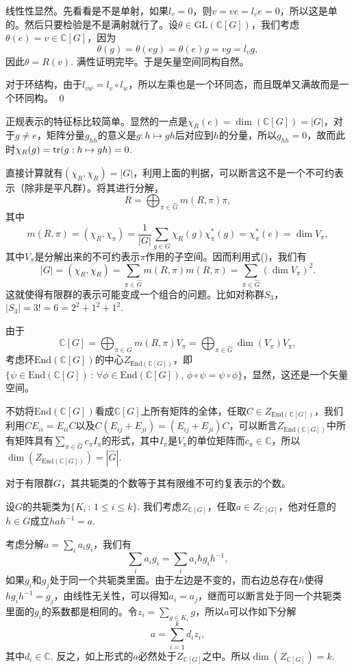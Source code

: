 \documentclass[10pt]{article}
\newcommand{\cc}{\mathbb{C}}
\begin{document}
\proof
	线性性显然。先看看是不是单射，如果$l_v=0$，则$v=ve=l_ve=0$，所以这是单的。然后只要检验是不是满射就行了。设$\theta\in \mathrm{GL}(\cc [G])$，我们考虑$\theta(e)=v\in \cc [G]$，因为
	\[
		\theta(g)=\theta(eg)=\theta(e)g=vg=l_vg,
	\]
	因此$\theta=R(v)$. 满性证明完毕。于是矢量空间同构自然。

	对于环结构，由于$l_{vw}=l_v\circ l_w$，所以左乘也是一个环同态，而且既单又满故而是一个环同构。
\qed

\para 正规表示的特征标比较简单。显然的一点是$\chi_R(e)=\dim (\cc [G])=|G|$，对于$g\neq e$，矩阵分量$g_{hh}$的意义是$g:h\mapsto gh$后对应到$h$的分量，所以$g_{hh}=0$，故而此时$\chi_R(g)=\operatorname{tr}(g:h\mapsto gh)=0$.

直接计算就有$(\chi_{R},\chi_{R})=|G|$，利用上面的判据，可以断言这不是一个不可约表示（除非是平凡群）。将其进行分解，
\[
	R=\bigoplus_{\pi\in\hat{G}}m(R,\pi)\pi,
\]
其中
\[
	m(R,\pi)=(\chi_R,\chi_\pi)=\frac{1}{|G|}\sum_{g\in G}\chi_R(g)\chi_{\pi}^*(g)=\chi_{\pi}^*(e)=\dim V_{\pi},
\]
其中$V_\pi$是分解出来的不可约表示$\pi$作用的子空间。因而利用式(\theequation)，我们有
\[
	|G|=(\chi_{R},\chi_{R})=\sum_{\pi\in\hat{G}}m(R,\pi)m(R,\pi)=\sum_{\pi\in\hat{G}}(\dim V_{\pi})^2.
\]
这就使得有限群的表示可能变成一个组合的问题。比如对称群$S_3$，$|S_3|=3!=6=2^2+1^2+1^2$.

\para 由于
\[
	\cc [G]=\bigoplus_{\pi\in\hat{G}}m(R,\pi)V_\pi=\bigoplus_{\pi\in\hat{G}}\dim(V_\pi)V_\pi,
\]
考虑环$\mathrm{End}(\cc [G])$的中心$Z_{\mathrm{End}(\cc [G])}$，即$\{\psi\in \mathrm{End}(\cc [G])\,:\, \forall \phi\in \mathrm{End}(\cc [G]),\, \phi\circ\psi=\psi\circ\phi\}$，显然，这还是一个矢量空间。

不妨将$\mathrm{End}(\cc [G])$看成$\cc [G]$上所有矩阵的全体，任取$C\in Z_{\mathrm{End}(\cc [G])}$，我们利用$CE_{ii}=E_{ii}C$以及$C(E_{ij}+E_{ji})=(E_{ij}+E_{ji})C$，可以断言$Z_{\mathrm{End}(\cc [G])}$中所有矩阵具有$\sum_{\pi\in \hat{G}}c_\pi I_\pi$的形式，其中$I_\pi$是$V_\pi$的单位矩阵而$c_\pi\in\cc$，所以$\dim (Z_{\mathrm{End}(\cc [G])})=|\hat{G}|$.

\theo 对于有限群$G$，其共轭类的个数等于其有限维不可约复表示的个数。

\proof 设$G$的共轭类为$\{K_i\,:\, 1\leq i\leq k\}$. 我们考虑$Z_{\cc [G]}$，任取$a\in Z_{\cc [G]}$，他对任意的$h\in G$成立$hah^{-1}=a$. 

考虑分解$a=\sum_i a_ig_i$，我们有
\[
	\sum_i a_ig_i=\sum_i a_ihg_ih^{-1},
\]
如果$g_i$和$g_j$处于同一个共轭类里面。由于左边是不变的，而右边总存在$h$使得$hg_ih^{-1}=g_j$，由线性无关性，可以得知$a_i=a_j$，继而可以断言处于同一个共轭类里面的$g_i$的系数都是相同的。令$z_i=\sum_{g\in K_i}g$，所以$a$可以作如下分解
\[
	a=\sum_{i=1}^kd_iz_i,
\]
其中$d_i\in \cc$. 反之，如上形式的$a$必然处于$Z_{\cc [G]}$之中。所以$\dim (Z_{\cc [G]})=k$.
\end{document}
